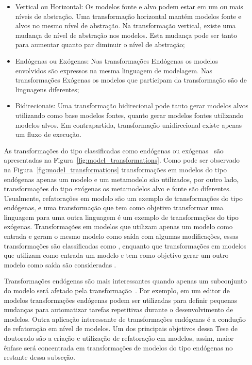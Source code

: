 \begin{itemize}
	\item Vertical ou Horizontal: Os modelos fonte e alvo podem estar em um ou mais níveis de abstração. Uma transformação horizontal mantém modelos fonte e alvos no mesmo nível de abstração. Na transformação vertical, existe uma mudança de nível de abstração nos modelos. Esta mudança pode ser tanto para aumentar quanto par diminuir o nível de abstração;
	\item  Endógenas ou Exógenas: Nas transformações Endógenas os modelos envolvidos são expressos na mesma linguagem de modelagem. Nas transformações Exógenas os modelos que participam da transformação são de linguagens diferentes;
	\item Bidirecionais: Uma transformação bidirecional pode tanto gerar modelos alvos utilizando como base modelos fontes, quanto gerar modelos fontes utilizando modelos alvos. Em contrapartida, transformação unidirecional existe apenas um fluxo de execução. 
\end{itemize}

As transformações do tipo classificadas como endógenas ou exógenas~\cite{Brambilla_2012} são apresentadas na Figura~\ref{fig:model_transformations}. Como pode ser observado na Figura~\ref{fig:model_transformations} transformações em modelos do tipo endógenas apenas um modelo e um metamodelo são utilizados, por outro lado, transformações do tipo exógenas os metamodelos alvo e fonte são diferentes. Usualmente, refatorações em modelo são um exemplo de transformações do tipo endógenas, e uma transformação que tem como objetivo transformar uma linguagem para uma outra linguagem é um exemplo de transformações do tipo exógenas. Transformações em modelos que utilizam apenas um modelo como entrada e geram o mesmo modelo como saída com algumas modificações, essas transformações são classificadas como , enquanto que transformações em modelos que utilizam como entrada um modelo e tem como objetivo gerar um outro modelo como saída são consideradas . 

Transformações endógenas são mais interessantes quando apenas um subconjunto do modelo será afetado pela transformação~\cite{Brambilla_2012}. Por exemplo, em um editor de modelos transformações endógenas podem ser utilizadas para definir pequenas mudanças para automatizar tarefas repetitivas durante o desenvolvimento de modelos. Outra aplicação interessante de transformações endógenas é a condução de refatoração em nível de modelos. Um dos principais objetivos dessa Tese de doutorado são a criação e utilização de refatoração em modelos, assim, maior ênfase será concentrada em transformações de modelos do tipo endógenas no restante dessa subseção.


